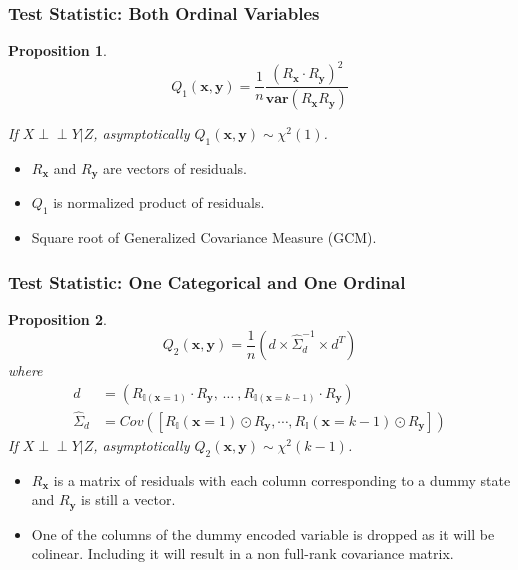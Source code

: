 \documentclass{beamer}
\def\ci{\perp\!\!\!\!\!\perp}
\newtheorem{proposition}{Proposition}
\begin{document}
\begin{frame}
	\frametitle{Test Statistic: Both Ordinal Variables}
	\begin{proposition}
	$$ Q_1(\bm{x}, \bm{y}) = \frac{1}{n} \frac{(R_{\bm{x}} \cdot R_{\bm{y}})^2}{\bm{var}(R_{\bm{x}} R_{\bm{y}})} $$
		\begin{center} If $ X \ci Y | Z $, asymptotically $ Q_1(\bm{x}, \bm{y}) \sim \chi^2(1) $. \end{center}
	\end{proposition}
	\begin{center}
		\begin{itemize}
			\item $ R_{\bm{x}} $ and $ R_{\bm{y}} $ are vectors of residuals.
			\item $ Q_1 $ is normalized product of residuals.
			\item Square root of Generalized Covariance Measure (GCM)\footnotemark.
		\end{itemize}
	\end{center}
\end{frame}

\begin{frame}
	\frametitle{Test Statistic: One Categorical and One Ordinal}
	\begin{proposition}

		$$ Q_2(\bm{x}, \bm{y}) = \frac{1}{n} (d \times \hat{\Sigma}_d^{-1} \times d^T) $$
	where
	\begin{equation*}
		\begin{split}
		d &= (R_{\mathbb{I}(\mathbf{x}=1)} \cdot R_{\mathbf{y}}, \, \ldots \ , R_{\mathbb{I}(\mathbf{x}=k-1)} \cdot R_{\mathbf{y}}) \\ 
		\hat{\Sigma}_d &= Cov([R_\mathbb{I}(\mathbf{x}=1) \odot R_\mathbf{y}, \cdots, R_\mathbb{I}(\mathbf{x}=k-1) \odot R_\mathbf{y}])
		\end{split}
	\end{equation*}
		If $ X \ci Y | Z $, asymptotically $ Q_2(\bm{x}, \bm{y}) \sim \chi^2(k-1) $.
	\end{proposition}
	\begin{center}
		\begin{itemize}
			\item $ R_{\bm{x}} $ is a matrix of residuals with each column corresponding to a dummy state and $ R_{\bm{y}} $ is still a vector.
			\item One of the columns of the dummy encoded variable
				is dropped as it will be colinear. Including it will
				result in a non full-rank covariance matrix.
		\end{itemize}
	\end{center}
\end{frame}
\end{document}
